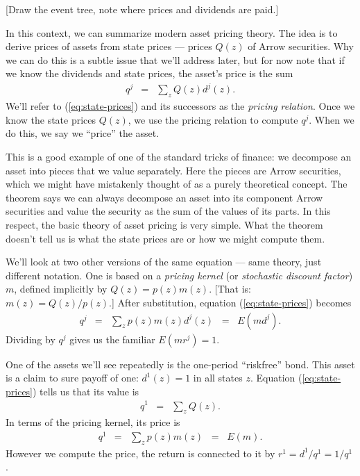 \documentclass[11pt]{article}
\begin{document}
[Draw the event tree, note where prices and dividends are paid.]

In this context, we can summarize modern asset pricing theory.
The idea is to derive prices of assets from state prices
--- prices $Q(z)$ of Arrow securities.
Why we can do this is a subtle issue that we'll address later,
but for now note that if we know the dividends and state prices,
the asset's price is the sum
\begin{eqnarray}
    q^j   &=& \sum_z Q(z) d^j(z) .
    \label{eq:state-prices}
\end{eqnarray}
We'll refer to (\ref{eq:state-prices}) and its successors
as the {\it pricing relation\/}.
Once we know the state prices $Q(z)$,
we use the pricing relation to compute $q^j$.
When we do this, we say we ``price'' the asset.


This is a good example of one of the standard tricks of finance:
we decompose an asset into pieces that we value separately.
Here the pieces are Arrow securities,
which we might have mistakenly thought of as a purely theoretical concept.
The theorem says we can always decompose an asset into its component Arrow securities
and value the security as the sum of the values of its parts.
In this respect, the basic theory of asset pricing is very simple.
What the theorem doesn't tell us is what the state prices are or how
we might compute them.

We'll look at two other versions of the same equation ---
same theory, just different notation.
One is based on a {\it pricing kernel\/}
(or {\it stochastic discount factor\/}) $m$,
defined implicitly  by $ Q(z) = p(z) m(z) $.
[That is:  $m(z) = Q(z)/p(z)$.]
After substitution,
equation (\ref{eq:state-prices}) becomes
\begin{eqnarray}
    q^j   &=& \sum_z p(z) m(z) d^j(z)  \;\;=\;\; E (m d^j) .
    \label{eq:pricing-kernel}
\end{eqnarray}
Dividing by $q^j$ gives us the familiar $E(mr^j) = 1$.

One of the assets we'll see repeatedly is the one-period ``riskfree'' bond.
This asset is a claim to sure payoff of one:  $d^1(z) = 1$ in all states $z$.
Equation (\ref{eq:state-prices}) tells us that its value is
\begin{eqnarray*}
    q^1 &=& \sum_z Q(z) .
\end{eqnarray*}
In terms of the pricing kernel, its price is
\begin{eqnarray*}
    q^1 &=& \sum_z p(z) m(z) \;\;=\;\; E(m) .
\end{eqnarray*}
However we compute the price, the return is connected to it
by $ r^1 = d^1/q^1 = 1/ q^1 $.
\end{document}
